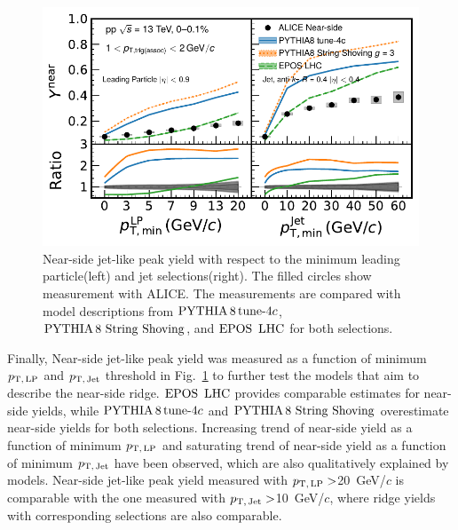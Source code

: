 \begin{figure}[h!]
	\centering
	\includegraphics[width=0.89\linewidth]{./figures/Fig9_JetYieldESE.pdf}
	\caption{ Near-side jet-like peak yield with respect to the minimum leading particle(left) and jet selections(right). The filled circles show measurement with ALICE. The measurements are compared with model descriptions from $\mathrm{PYTHIA}\,8\,\mathrm{tune}{\text -}4c$, ${\mathrm{PYTHIA}\,8~\mathrm{String}~}\mathrm{Shoving}$, and ${\mathrm{EPOS}\,~\mathrm{LHC}}$ for both selections.}
	\label{fig:JetYield_ESE}
\end{figure}

Finally, Near-side jet-like peak yield was measured as a function of minimum $p_\mathrm{T,\,LP}$ and $p_\mathrm{T,\,Jet}$ threshold in Fig.~\ref{fig:JetYield_ESE} to further test the models that aim to describe the near-side ridge.
${\mathrm{EPOS}\,~\mathrm{LHC}}$ provides comparable estimates for near-side yields, while $\mathrm{PYTHIA}\,8\,\mathrm{tune}{\text -}4c$ and ${\mathrm{PYTHIA}\,8~\mathrm{String}~}\mathrm{Shoving}$ overestimate near-side yields for both selections. Increasing trend of near-side yield as a function of minimum $p_\mathrm{T,\,LP}$ and saturating trend of near-side yield as a function of minimum $p_\mathrm{T,\,Jet}$ have been observed, which are also qualitatively explained by models. Near-side jet-like peak yield measured with $p_\mathrm{T,\,LP}>$20~GeV/$c$ is comparable with the one measured with $p_\mathrm{T,\,Jet}>$10~GeV/$c$, where ridge yields with corresponding selections are also comparable.